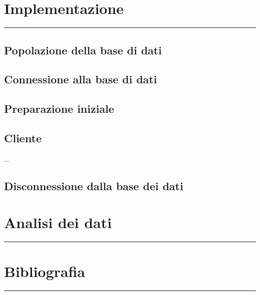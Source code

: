 \documentclass[legalpaper]{article}
\begin{document}
\section{Implementazione}
\rule{\linewidth}{1.5pt}
\subsection{Popolazione della base di dati}
\subsection{Connessione alla base di dati}
\subsection{Preparazione iniziale}
\subsection{Cliente}

...

\subsection{Disconnessione dalla base dei dati}
\newpage
\section{Analisi dei dati}
\rule{\linewidth}{1.5pt}

\newpage

\section{Bibliografia}
\rule{\linewidth}{1.5pt}
\end{document}
